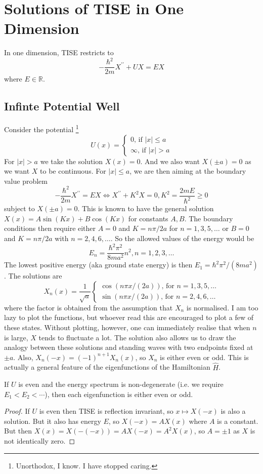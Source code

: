 \section{Solutions of TISE in One Dimension}
In one dimension, TISE restricts to
$$-\frac{\hbar^2}{2m}X^{\prime\prime}+UX=EX$$
where $E\in\mathbb R$.
\subsection{Infinte Potential Well}
Consider the potential
\footnote{Unorthodox, I know. I have stopped caring.}
$$U(x)=\begin{cases}
    0\text{, if $|x|\le a$}\\
    \infty\text{, if $|x|>a$}
\end{cases}$$
For $|x|>a$ we take the solution $X(x)=0$.
And we also want $X(\pm a)=0$ as we want $X$ to be continuous.
For $|x|\le a$, we are then aiming at the boundary value problem
$$-\frac{\hbar^2}{2m}X^{\prime\prime}=EX\iff X^{\prime\prime}+K^2X=0,K^2=\frac{2mE}{\hbar^2}\ge 0$$
subject to $X(\pm a)=0$.
This is known to have the general solution $X(x)=A\sin(Kx)+B\cos(Kx)$ for constants $A,B$.
The boundary conditions then require either $A=0$ and $K=n\pi/2a$ for $n=1,3,5,\ldots$ or $B=0$ and $K=n\pi/2a$ with $n=2,4,6,\ldots$.
So the allowed values of the energy would be
$$E_n=\frac{\hbar^2\pi^2}{8ma^2}n^2,n=1,2,3,\ldots$$
The lowest positive energy (aka ground state energy) is then $E_1=\hbar^2\pi^2/(8ma^2)$.
The solutions are
$$X_n(x)=\frac{1}{\sqrt{a}}\begin{cases}
    \cos(n\pi x/(2a))\text{, for $n=1,3,5,\ldots$}\\
    \sin(n\pi x/(2a))\text{, for $n=2,4,6,\ldots$}
\end{cases}$$
where the factor is obtained from the assumption that $X_n$ is normalised.
I am too lazy to plot the functions, but whoever read this are encouraged to plot a few of these states.
Without plotting, however, one can immediately realise that when $n$ is large, $X$ tends to fluctuate a lot.
The solution also allows us to draw the analogy between these solutions and standing waves with two endpoints fixed at $\pm a$.
Also, $X_n(-x)=(-1)^{n+1}X_n(x)$, so $X_n$ is either even or odd.
This is actually a general feature of the eigenfunctions of the Hamiltonian $\hat{H}$.
\begin{proposition}
    If $U$ is even and the energy spectrum is non-degenerate (i.e. we require $E_1<E_2<\cdots$), then each eigenfunction is either even or odd.
\end{proposition}
\begin{proof}
    If $U$ is even then TISE is reflection invariant, so $x\mapsto X(-x)$ is also a solution.
    But it also has energy $E$, so $X(-x)=AX(x)$ where $A$ is a constant.
    But then $X(x)=X(-(-x))=AX(-x)=A^2X(x)$, so $A=\pm 1$ as $X$ is not identically zero.
\end{proof}
